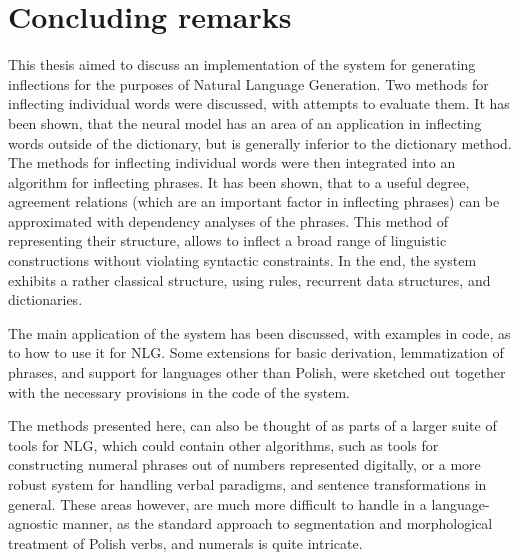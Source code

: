 \documentclass[12pt]{article}
\begin{document}
\section{Concluding remarks}
This thesis aimed to discuss an implementation of the system for generating inflections for the purposes of Natural Language Generation. Two methods for inflecting individual words were discussed, with attempts to evaluate them. It has been shown, that the neural model has an area of an application in inflecting words outside of the dictionary, but is generally inferior to the dictionary method. The methods for inflecting individual words were then integrated into an algorithm for inflecting phrases. It has been shown, that to a useful degree, agreement relations (which are an important factor in inflecting phrases) can be approximated with dependency analyses of the phrases. This method of representing their structure, allows to inflect a broad range of linguistic constructions without violating syntactic constraints. In the end, the system exhibits a rather classical structure, using rules, recurrent data structures, and dictionaries. 

The main application of the system has been discussed, with examples in code, as to how to use it for NLG. Some extensions for basic derivation, lemmatization of phrases, and support for languages other than Polish, were sketched out together with the necessary provisions in the code of the system.

The methods presented here, can also be thought of as parts of a larger suite of tools for NLG, which could contain other algorithms, such as tools for constructing numeral phrases out of numbers represented digitally, or a more robust system for handling verbal paradigms, and sentence transformations in general. These areas however, are much more difficult to handle in a language-agnostic manner, as the standard approach to segmentation and morphological treatment of Polish verbs, and numerals is quite intricate. 



\end{document}
